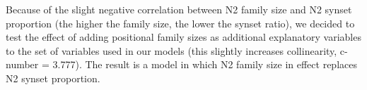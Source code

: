 
Because of the slight negative correlation between N2 family size and N2
synset proportion (the higher the family size, the lower the synset
ratio), we decided to test the effect of adding positional family sizes as
additional explanatory variables to the set of variables used in our
models (this slightly increases collinearity, c-number = 3.777). The
result is a model in which N2 family size in effect replaces N2 synset proportion. 




